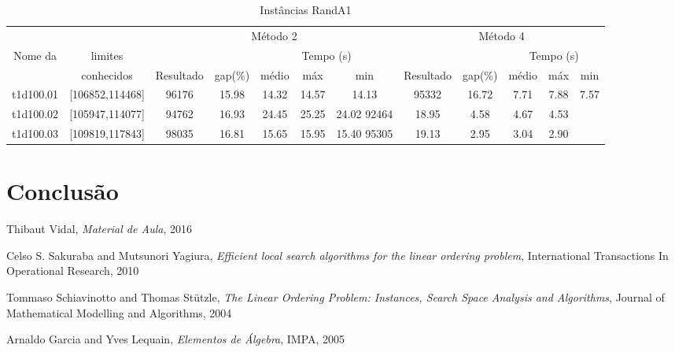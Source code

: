 \documentclass[a4paper,10pt,onecolumn]{article}
\begin{document}
\begin{table}[htbp]
  \noindent
  \footnotesize
  \centering
  \begin{tabular*}{\linewidth}{|c|c|ccccc|ccccc|}
    \hline 
    &  & 
    \multicolumn{5}{c|}{Método 2} &
    \multicolumn{5}{c|}{Método 4} \\
    Nome da & limites & 
    && \multicolumn{3}{c|}{Tempo (s)} &
    && \multicolumn{3}{c|}{Tempo (s)} \\
    &  conhecidos & 
    Resultado & gap(\%) & médio & máx & min &
    Resultado & gap(\%)  & médio & máx & min 
\\
    \hline
t1d100.01 & [106852,114468] &
96176 & 15.98 & 14.32   & 14.57  & 14.13 &
95332 & 16.72 & 7.71   & 7.88  & 7.57 \\
t1d100.02 & [105947,114077] &
94762 & 16.93 & 24.45   & 25.25  & 24.02
92464 & 18.95 & 4.58   & 4.67  & 4.53 \\
t1d100.03 & [109819,117843] &
98035 & 16.81 & 15.65   & 15.95  & 15.40
95305 & 19.13 & 2.95   & 3.04  & 2.90 \\
    \hline
  \end{tabular*}
  \caption{Instâncias RandA1}
\end{table}

\section{Conclusão}

\begin{thebibliography}{99}
 Thibaut Vidal, \emph{Material de Aula}, 2016

 Celso S. Sakuraba and Mutsunori Yagiura,
\emph{Efficient local search algorithms for the linear ordering problem},
International Transactions In Operational Research, 2010

 Tommaso Schiavinotto and Thomas Stützle, \emph{The Linear
Ordering Problem: Instances, Search Space Analysis and Algorithms}, Journal of
Mathematical Modelling and Algorithms, 2004

 Arnaldo Garcia and Yves Lequain, \emph{Elementos de
Álgebra}, IMPA, 2005


\end{thebibliography}
\end{document}
